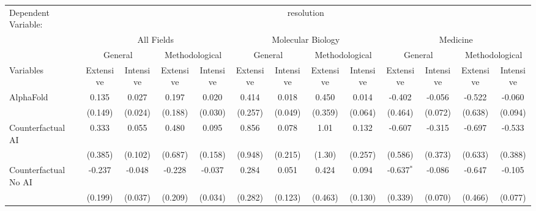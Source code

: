 \begingroup
\centering
\begin{tabular}{lcccccccccccc}
   \tabularnewline \midrule \midrule
   Dependent Variable: & \multicolumn{12}{c}{resolution}\\
 & \multicolumn{4}{c}{All Fields} & \multicolumn{4}{c}{Molecular Biology} & \multicolumn{4}{c}{Medicine} \\
\cmidrule(lr){2-5} \cmidrule(lr){6-9} \cmidrule(lr){10-13}
 & \multicolumn{2}{c}{General} & \multicolumn{2}{c}{Methodological} & \multicolumn{2}{c}{General} & \multicolumn{2}{c}{Methodological} & \multicolumn{2}{c}{General} & \multicolumn{2}{c}{Methodological} \\
\cmidrule(lr){2-3} \cmidrule(lr){4-5} \cmidrule(lr){6-7} \cmidrule(lr){8-9} \cmidrule(lr){10-11} \cmidrule(lr){12-13}
Variables & \multicolumn{1}{c}{Extensive} & \multicolumn{1}{c}{Intensive} & \multicolumn{1}{c}{Extensive} & \multicolumn{1}{c}{Intensive} & \multicolumn{1}{c}{Extensive} & \multicolumn{1}{c}{Intensive} & \multicolumn{1}{c}{Extensive} & \multicolumn{1}{c}{Intensive} & \multicolumn{1}{c}{Extensive} & \multicolumn{1}{c}{Intensive} & \multicolumn{1}{c}{Extensive} & \multicolumn{1}{c}{Intensive} \\
\cmidrule(lr){1-1}\cmidrule(lr){2-2} \cmidrule(lr){3-3} \cmidrule(lr){4-4} \cmidrule(lr){5-5} \cmidrule(lr){6-6} \cmidrule(lr){7-7} \cmidrule(lr){8-8} \cmidrule(lr){9-9} \cmidrule(lr){10-10} \cmidrule(lr){11-11} \cmidrule(lr){12-12} \cmidrule(lr){13-13}
   AlphaFold                                & 0.135   & 0.027   & 0.197   & 0.020   & 0.414   & 0.018   & 0.450   & 0.014   & -0.402       & -0.056      & -0.522  & -0.060\\   
                                            & (0.149) & (0.024) & (0.188) & (0.030) & (0.257) & (0.049) & (0.359) & (0.064) & (0.464)      & (0.072)     & (0.638) & (0.094)\\   
   Counterfactual AI                        & 0.333   & 0.055   & 0.480   & 0.095   & 0.856   & 0.078   & 1.01    & 0.132   & -0.607       & -0.315      & -0.697  & -0.533\\   
                                            & (0.385) & (0.102) & (0.687) & (0.158) & (0.948) & (0.215) & (1.30)  & (0.257) & (0.586)      & (0.373)     & (0.633) & (0.388)\\   
   Counterfactual No AI                     & -0.237  & -0.048  & -0.228  & -0.037  & 0.284   & 0.051   & 0.424   & 0.094   & -0.637$^{*}$ & -0.086      & -0.647  & -0.105\\   
                                            & (0.199) & (0.037) & (0.209) & (0.034) & (0.282) & (0.123) & (0.463) & (0.130) & (0.339)      & (0.070)     & (0.466) & (0.077)\\   

\end{tabular}

